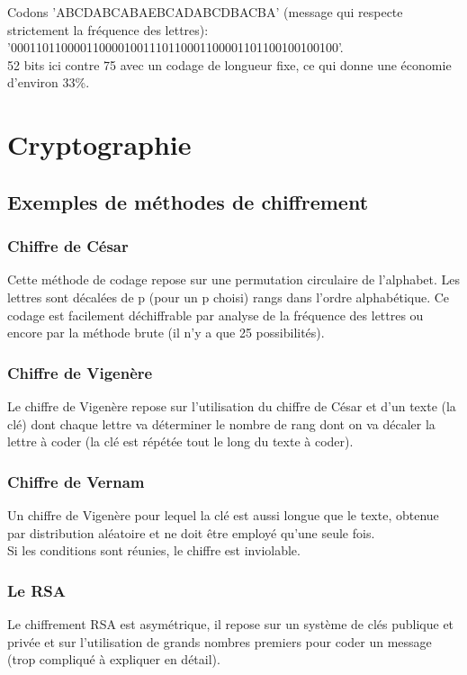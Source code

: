 \documentclass[a4paper,10pt]{book}
\begin{document}
Codons 'ABCDABCABAEBCADABCDBACBA' (message qui respecte strictement la fréquence des lettres):
'0001101100001100001001110110001100001101100100100100'.\\

52 bits ici contre 75 avec un codage de longueur fixe, ce qui donne une économie d'environ 33\%.

\section{Cryptographie}
\subsection{Exemples de méthodes de chiffrement}
\subsubsection{Chiffre de César}
Cette méthode de codage repose sur une permutation circulaire de l’alphabet. Les lettres sont décalées de p (pour un p choisi) rangs dans l’ordre alphabétique. Ce codage est facilement déchiffrable par analyse de la fréquence des lettres ou encore par la méthode brute (il n'y a que 25 possibilités).

\subsubsection{Chiffre de Vigenère}
Le chiffre de Vigenère repose sur l'utilisation du chiffre de César et d'un texte (la clé) dont chaque lettre va déterminer le nombre de rang dont on va décaler la lettre à coder (la clé est répétée tout le long du texte à coder).

\subsubsection{Chiffre de Vernam}
Un chiffre de Vigenère pour lequel la clé est aussi longue que le texte, obtenue par distribution aléatoire et ne doit être employé qu’une seule fois.\\
Si les conditions sont réunies, le chiffre est inviolable.

\subsubsection{Le RSA}
Le chiffrement RSA est asymétrique, il repose sur un système de clés publique et privée et sur l'utilisation de grands nombres premiers pour coder un message (trop compliqué à expliquer en détail).
\end{document}
